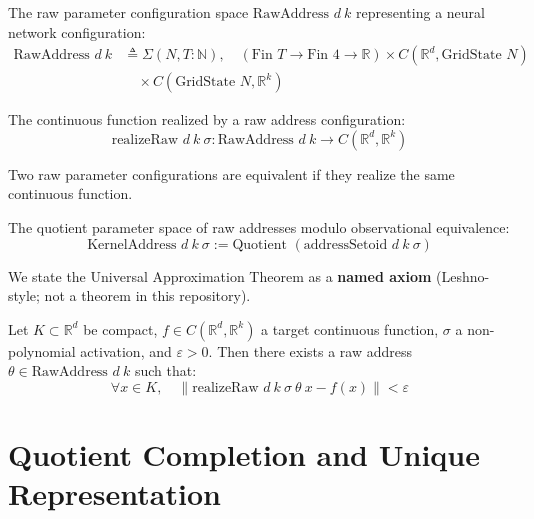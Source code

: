 \begin{definition}
The raw parameter configuration space $\text{RawAddress } d\ k$ representing a neural network configuration:
\begin{align*}
\text{RawAddress } d\ k &\triangleq \Sigma (N, T : \mathbb{N}), \quad (\text{Fin } T \to \text{Fin } 4 \to \mathbb{R}) \times C(\mathbb{R}^d, \text{GridState } N) \\
&\quad \times C(\text{GridState } N, \mathbb{R}^k)
\end{align*}
\end{definition}

\begin{definition}
The continuous function realized by a raw address configuration:
$$\text{realizeRaw } d\ k\ \sigma : \text{RawAddress } d\ k \to C(\mathbb{R}^d, \mathbb{R}^k)$$
\end{definition}

\begin{definition}
Two raw parameter configurations are equivalent if they realize the same continuous function.
\end{definition}

\begin{definition}
The quotient parameter space of raw addresses modulo observational equivalence:
$$\text{KernelAddress } d\ k\ \sigma := \text{Quotient } (\text{addressSetoid } d\ k\ \sigma)$$
\end{definition}

We state the Universal Approximation Theorem as a \textbf{named axiom} (Leshno-style; not a theorem in this repository).

\begin{axiom}
Let $K \subset \mathbb{R}^d$ be compact, $f \in C(\mathbb{R}^d, \mathbb{R}^k)$ a target continuous function, $\sigma$ a non-polynomial activation, and $\varepsilon > 0$. Then there exists a raw address $\theta \in \text{RawAddress } d\ k$ such that:
$$\forall x \in K, \quad \| \text{realizeRaw } d\ k\ \sigma\ \theta\ x - f(x) \| < \varepsilon$$
\end{axiom}

\section{Quotient Completion and Unique Representation}

